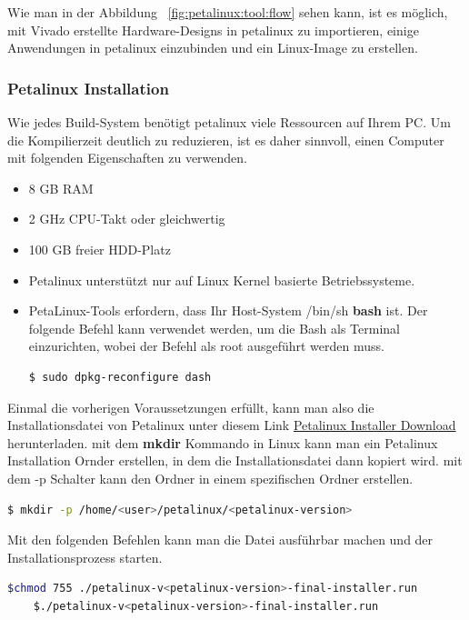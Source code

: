 Wie man in der Abbildung ~\ref{fig:petalinux:tool:flow} sehen kann, ist es möglich, mit Vivado erstellte Hardware-Designs in petalinux zu importieren, einige Anwendungen in petalinux einzubinden und ein Linux-Image zu erstellen.  

\subsubsection{Petalinux Installation}
Wie jedes Build-System benötigt petalinux viele Ressourcen auf Ihrem PC. Um die Kompilierzeit deutlich zu reduzieren, ist es daher sinnvoll, einen Computer mit folgenden Eigenschaften zu verwenden.\cite{Xilinx2020}

\begin{itemize}
	\item 8 GB RAM
	\item 2 GHz CPU-Takt oder gleichwertig
	\item 100 GB freier HDD-Platz
	\item Petalinux unterstützt nur auf Linux Kernel basierte Betriebssysteme. 
	\item PetaLinux-Tools erfordern, dass Ihr Host-System /bin/sh \textbf{bash} ist. Der folgende Befehl kann verwendet werden, um die Bash als Terminal einzurichten, wobei der Befehl als root ausgeführt werden muss. 
	\begin{lstlisting}[language=bash]
		$ sudo dpkg-reconfigure dash
	\end{lstlisting}
\end{itemize}

 Einmal die vorherigen Voraussetzungen erfüllt, kann man also die Installationsdatei von Petalinux unter diesem Link \href{https://www.xilinx.com/support/download/index.html/content/xilinx/en/downloadNav/embedded-design-tools.html}{Petalinux Installer Download}  herunterladen. 
 mit dem \textbf{mkdir} Kommando in Linux kann man ein Petalinux Installation Ornder erstellen, in dem die Installationsdatei dann kopiert wird. mit dem -p Schalter kann den Ordner in einem spezifischen Ordner erstellen.\\
 
\begin{lstlisting}[language=bash]
 	$ mkdir -p /home/<user>/petalinux/<petalinux-version>
\end{lstlisting}

Mit den folgenden Befehlen kann man die Datei ausführbar machen und der Installationsprozess starten.
\begin{lstlisting}[language=bash]
 	$chmod 755 ./petalinux-v<petalinux-version>-final-installer.run
	$./petalinux-v<petalinux-version>-final-installer.run
\end{lstlisting}

